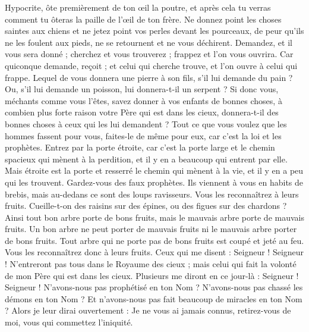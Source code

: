 \begin{multicols}{2}
Hypocrite, ôte premièrement de ton œil la poutre, et après cela tu verras comment tu ôteras la paille de l'œil de ton frère.
Ne donnez point les choses saintes aux chiens et ne jetez point vos perles devant les pourceaux, de peur qu'ils ne les foulent aux pieds, ne se retournent et ne vous déchirent.
Demandez, et il vous sera donné ; cherchez et vous trouverez ; frappez et l'on vous ouvrira.
Car quiconque demande, reçoit ; et celui qui cherche trouve, et l'on ouvre à celui qui frappe.
Lequel de vous donnera une pierre à son fils, s'il lui demande du pain ?
Ou, s'il lui demande un poisson, lui donnera-t-il un serpent ?
Si donc vous, méchants comme vous l'êtes, savez donner à vos enfants de bonnes choses, à combien plus forte raison votre Père qui est dans les cieux, donnera-t-il des bonnes choses à ceux qui les lui demandent ?
Tout ce que vous voulez que les hommes fassent pour vous, faites-le de même pour eux, car c'est la loi et les prophètes.
Entrez par la porte étroite, car c'est la porte large et le chemin spacieux qui mènent à la perdition, et il y en a beaucoup qui entrent par elle.
Mais étroite est la porte et resserré le chemin qui mènent à la vie, et il y en a peu qui les trouvent.
Gardez-vous des faux prophètes. Ils viennent à vous en habits de brebis, mais au-dedans ce sont des loups ravisseurs.
Vous les reconnaîtrez à leurs fruits. Cueille-t-on des raisins sur des épines, ou des figues sur des chardons ?
Ainsi tout bon arbre porte de bons fruits, mais le mauvais arbre porte de mauvais fruits.
Un bon arbre ne peut porter de mauvais fruits ni le mauvais arbre porter de bons fruits.
Tout arbre qui ne porte pas de bons fruits est coupé et jeté au feu.
Vous les reconnaîtrez donc à leurs fruits.
Ceux qui me disent : Seigneur ! Seigneur ! N'entreront pas tous dans le Royaume des cieux ; mais celui qui fait la volonté de mon Père qui est dans les cieux.
Plusieurs me diront en ce jour-là : Seigneur ! Seigneur ! N'avons-nous pas prophétisé en ton Nom ? N'avons-nous pas chassé les démons en ton Nom ? Et n'avons-nous pas fait beaucoup de miracles en ton Nom ?
Alors je leur dirai ouvertement : Je ne vous ai jamais connus,  retirez-vous de moi, vous qui commettez l'iniquité.

\end{multicols}
